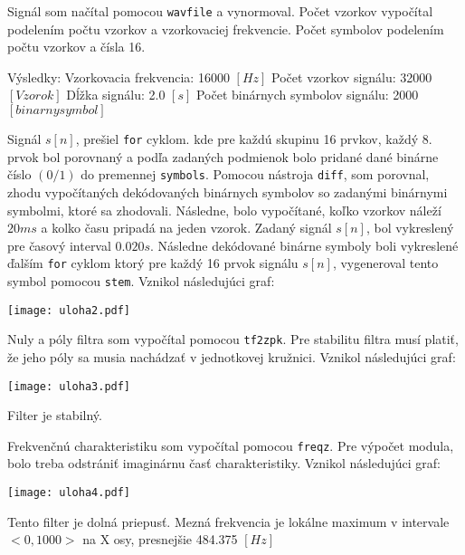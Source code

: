 \documentclass[11pt]{homework}
\begin{document}
\maketitle


	Signál som načítal pomocou \verb|wavfile| a vynormoval. Počet vzorkov vypočítal podelením počtu vzorkov a vzorkovaciej frekvencie. Počet symbolov podelením počtu vzorkov a čísla 16.	

	Výsledky:
	\newline
	Vzorkovacia frekvencia: 16000 $[Hz]$
	\newline
	Počet vzorkov signálu: 32000 $[Vzorok]$
	\newline	
	Dĺžka signálu: 2.0 $[s]$
	\newline 
	Počet binárnych symbolov signálu: 2000 $[binarny symbol]$
	


Signál $s[n]$, prešiel \verb|for| cyklom. kde pre každú skupinu 16 prvkov, každý 8. prvok bol porovnaný a podľa zadaných podmienok bolo pridané dané binárne číslo 
$(0/1)$ do premennej \verb|symbols|. \newline
Pomocou nástroja \verb|diff|, som porovnal, zhodu vypočítaných dekódovaných binárnych symbolov so zadanými binárnymi symbolmi, ktoré sa zhodovali. Následne, bolo vypočítané, koľko vzorkov náleží $20ms$ a kolko času pripadá na jeden vzorok. \newline
Zadaný signál $s[n]$, bol vykreslený pre časový interval $0.020s$. Následne dekódované binárne symboly boli vykreslené ďalším \verb|for| cyklom  ktorý pre každý 16 prvok signálu $s[n]$, vygeneroval tento symbol pomocou \verb|stem|.\newline
Vznikol následujúci graf:
\begin{center}
\texttt{[image: uloha2.pdf]}
\end{center}

Nuly a póly filtra som vypočítal pomocou \verb|tf2zpk|. Pre stabilitu filtra musí platiť, že jeho póly sa musia nachádzať v jednotkovej kružnici. \newline
Vznikol následujúci graf:
\begin{center}
\texttt{[image: uloha3.pdf]}
\end{center}
Filter je stabilný.

Frekvenčnú charakteristiku som vypočítal pomocou \verb|freqz|. Pre výpočet modula, bolo treba odstrániť imaginárnu časť charakteristiky.\newline
Vznikol následujúci graf:
\begin{center}
\texttt{[image: uloha4.pdf]}
\end{center}
Tento filter je dolná priepusť.
Mezná frekvencia je lokálne maximum v intervale $<0,1000>$ na X osy, presnejšie 484.375 $[Hz]$
\end{document}
